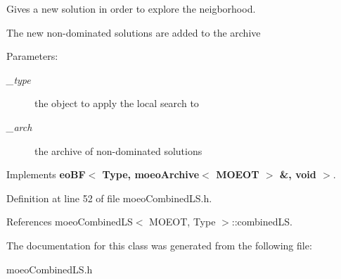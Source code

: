Gives a new solution in order to explore the neigborhood. 

The new non-dominated solutions are added to the archive \begin{Desc}
\item[Parameters:]
\begin{description}
\item[{\em \_\-type}]the object to apply the local search to \item[{\em \_\-arch}]the archive of non-dominated solutions \end{description}
\end{Desc}


Implements {\bf eo\-BF$<$ Type, moeo\-Archive$<$ MOEOT $>$ \&, void $>$}.

Definition at line 52 of file moeo\-Combined\-LS.h.

References moeo\-Combined\-LS$<$ MOEOT, Type $>$::combined\-LS.

The documentation for this class was generated from the following file:\begin{CompactItemize}
\item 
moeo\-Combined\-LS.h\end{CompactItemize}
